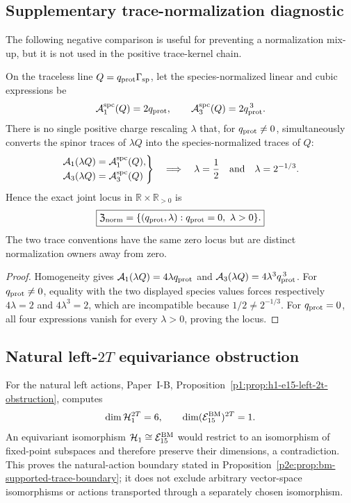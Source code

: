 \documentclass[11pt,a4paper]{article}
\begin{document}
\subsection{Supplementary trace-normalization diagnostic}
\label{p2e:app:supplementary-normalization}
The following negative comparison is useful for preventing a normalization
mix-up, but it is not used in the positive trace-kernel chain.

\begin{proposition}
\label{p2e:prop:empty-spinor-species-rescaling-locus}
On the traceless line \(Q=q_{\rm prot}\Gamma_{\rm sp}\), let the
species-normalized linear and cubic expressions be
\[
 \mathcal A^{\rm spc}_1(Q)=2q_{\rm prot},
 \qquad
 \mathcal A^{\rm spc}_3(Q)=2q_{\rm prot}^{\,3}.
\]
There is no single positive charge rescaling \(\lambda\) that, for
\(q_{\rm prot}\neq0\), simultaneously converts the spinor traces of
\(\lambda Q\) into the species-normalized traces of \(Q\):
\[
 \left.
 \begin{aligned}
  \mathcal A_1(\lambda Q)&=\mathcal A^{\rm spc}_1(Q),\\
  \mathcal A_3(\lambda Q)&=\mathcal A^{\rm spc}_3(Q)
 \end{aligned}
 \right\}
 \quad\Longrightarrow\quad
 \lambda=\frac12
 \quad\text{and}\quad
 \lambda=2^{-1/3}.
\]
Hence the exact joint locus in
\(\mathbb R\times\mathbb R_{>0}\) is
\[
 \boxed{
 \mathfrak Z_{\rm norm}
 =\{(q_{\rm prot},\lambda):
       q_{\rm prot}=0,\ \lambda>0\}.}
\]
The two trace conventions have the same zero locus but are distinct
normalization owners away from zero.
\end{proposition}

\begin{proof}
Homogeneity gives
\(\mathcal A_1(\lambda Q)=4\lambda q_{\rm prot}\) and
\(\mathcal A_3(\lambda Q)=4\lambda^3q_{\rm prot}^{\,3}\).
For \(q_{\rm prot}\neq0\), equality with the two displayed species values
forces respectively \(4\lambda=2\) and \(4\lambda^3=2\), which are
incompatible because \(1/2\neq2^{-1/3}\).  For \(q_{\rm prot}=0\), all four
expressions vanish for every \(\lambda>0\), proving the locus.
\end{proof}

\subsection{Natural left-\texorpdfstring{\(2T\)}{2T} equivariance obstruction}
\label{p2e:app:natural-action-no-go}
For the natural left actions, Paper~I-B,
Proposition~\ref{p1:prop:h1-e15-left-2t-obstruction}, computes
\[
 \dim\mathcal H_1^{2T}=6,
 \qquad
 \dim(\mathcal E_{15}^{\rm BM})^{2T}=1.
\]
An equivariant isomorphism
\(\mathcal H_1\cong\mathcal E_{15}^{\rm BM}\) would restrict to an
isomorphism of fixed-point subspaces and therefore preserve their dimensions,
a contradiction.  This proves the natural-action boundary stated in
Proposition~\ref{p2e:prop:bm-supported-trace-boundary}; it does not exclude
arbitrary vector-space isomorphisms or actions transported through a separately
chosen isomorphism.
\end{document}
